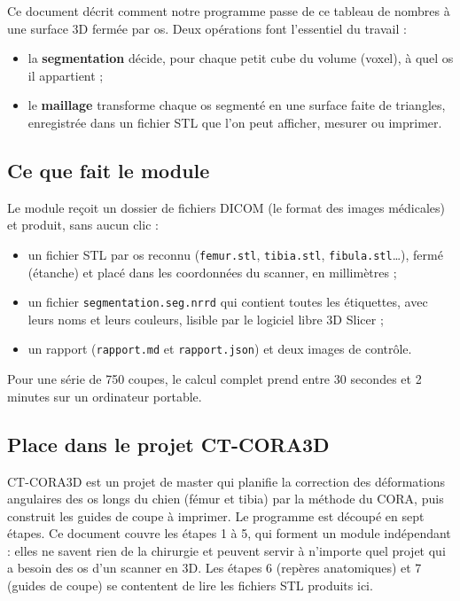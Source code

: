 \documentclass[11pt,a4paper]{article}
\newcommand{\fichier}[1]{\texttt{\small #1}}
\begin{document}
Ce document décrit comment notre programme passe de ce tableau de nombres à une surface 3D fermée par os. Deux
opérations font l'essentiel du travail :
\begin{itemize}
  \item la \textbf{segmentation} décide, pour chaque petit cube du volume (voxel), à quel os il appartient ;
  \item le \textbf{maillage} transforme chaque os segmenté en une surface faite de triangles, enregistrée dans un
  fichier STL que l'on peut afficher, mesurer ou imprimer.
\end{itemize}

\subsection{Ce que fait le module}

Le module reçoit un dossier de fichiers DICOM (le format des images médicales) et produit, sans aucun clic :
\begin{itemize}
  \item un fichier STL par os reconnu (\fichier{femur.stl}, \fichier{tibia.stl}, \fichier{fibula.stl}\ldots), fermé
  (étanche) et placé dans les coordonnées du scanner, en millimètres ;
  \item un fichier \fichier{segmentation.seg.nrrd} qui contient toutes les étiquettes, avec leurs noms et leurs
  couleurs, lisible par le logiciel libre 3D Slicer \cite{fedorov2012} ;
  \item un rapport (\fichier{rapport.md} et \fichier{rapport.json}) et deux images de contrôle.
\end{itemize}
Pour une série de 750 coupes, le calcul complet prend entre 30 secondes et 2 minutes sur un ordinateur portable.

\subsection{Place dans le projet CT-CORA3D}

CT-CORA3D est un projet de master qui planifie la correction des déformations angulaires des os longs du chien (fémur
et tibia) par la méthode du CORA, puis construit les guides de coupe à imprimer. Le programme est découpé en sept
étapes. Ce document couvre les étapes 1 à 5, qui forment un module indépendant : elles ne savent rien de la chirurgie
et peuvent servir à n'importe quel projet qui a besoin des os d'un scanner en 3D. Les étapes 6 (repères anatomiques)
et 7 (guides de coupe) se contentent de lire les fichiers STL produits ici.
\end{document}
